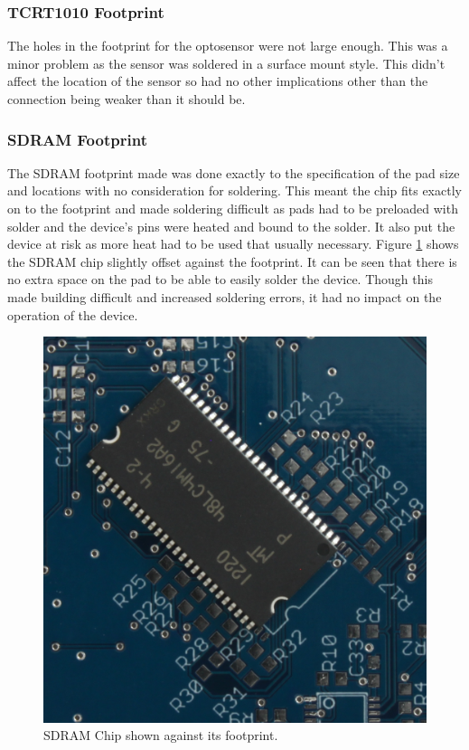 \subsubsection{TCRT1010 Footprint}
The holes in the footprint for the optosensor were not large enough. This was a minor problem as the sensor was soldered in a surface mount style. This didn't affect the location of the sensor so had no other implications other than the connection being weaker than it should be. 
\subsubsection{SDRAM Footprint}
The SDRAM footprint made was done exactly to the specification of the pad size and locations with no consideration for soldering. This meant the chip fits exactly on to the footprint and made soldering difficult as pads had to be preloaded with solder and the device's pins were heated and bound to the solder. It also put the device at risk as more heat had to be used that usually necessary. Figure \ref{fig:SDRAM_Err} shows the SDRAM chip slightly offset against the footprint. It can be seen that there is no extra space on the pad to be able to easily solder the device. Though this made building difficult and increased soldering errors, it had no impact on the operation of the device.

\begin{figure}
\centering
\includegraphics[width=\textwidth / 2]{./Figures/PCB_SDRAM.jpg}
\caption{SDRAM Chip shown against its footprint.}
\label{fig:SDRAM_Err}
\end{figure}

